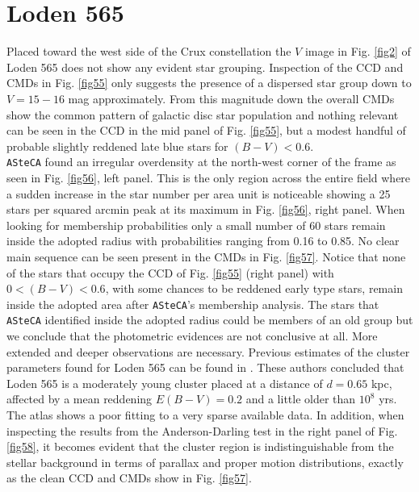 \documentclass[draft]{aa}
\begin{document}
\section{Loden 565}

Placed toward the west side of the Crux constellation the $V$ image in Fig. 
\ref{fig2} of Loden 565 does not show any evident star grouping. Inspection of
the CCD and CMDs in Fig. \ref{fig55} only suggests the presence of a dispersed
star group down to $V= 15-16$ mag approximately. From this magnitude down the
overall CMDs show the common pattern of galactic disc star population and
nothing relevant can be seen in the CCD in the mid panel of Fig. \ref{fig55}, but
a modest handful of probable slightly reddened late blue stars for
$(B-V)<0.6$.\\

\texttt{ASteCA} found an irregular overdensity at the north-west corner of the
frame as seen in Fig. \ref{fig56}, left panel. This is the only region across the
entire field where a sudden increase in the star number per area unit is
noticeable showing a 25 stars per squared arcmin peak at its maximum in Fig. 
\ref{fig56}, right panel.
%
When looking for membership probabilities only a small number of 60 stars
remain inside the adopted radius with probabilities ranging from 0.16 to
0.85. No clear main sequence can be seen present in the CMDs in Fig. 
\ref{fig57}. Notice that none of the stars that
occupy the CCD of Fig. \ref{fig55} (right panel) with $0<(B-V)<0.6$, with some
chances to be reddened early type stars, remain inside the adopted area after 
\texttt{ASteCA}'s membership analysis. The stars that \texttt{ASteCA}
identified inside the adopted radius could be members of an old group but we
conclude that the photometric evidences are not conclusive at all. More extended
and deeper observations are necessary. Previous estimates of the cluster
parameters found for Loden 565 can be found in \cite{Kharchenko_2005}.
These authors concluded that Loden 565 is a moderately young cluster placed at a
distance of $d=0.65$ kpc, affected by a mean reddening $E(B-V)= 0.2$ and
a little older than $10^8$ yrs. The \cite{Kharchenko_2005} atlas shows a
poor fitting to a very sparse available data. In addition, when inspecting the
results from the Anderson-Darling test in the right panel of Fig. \ref{fig58},
it becomes evident that the cluster region is indistinguishable from the
stellar background in terms of parallax and proper motion distributions,
exactly as the clean CCD and CMDs show in Fig. \ref{fig57}.\\
\end{document}
